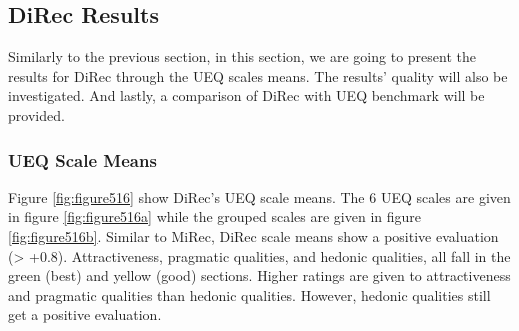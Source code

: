 \subsection{DiRec Results}
Similarly to the previous section, in this section, we are going to present the
results for DiRec through the UEQ scales means. The results' quality will also
be investigated. And lastly, a comparison of DiRec with UEQ benchmark will be
provided.
\subsubsection{UEQ Scale Means}
Figure \ref{fig:figure516} show DiRec's UEQ scale means. The 6 UEQ scales are
given in figure \ref{fig:figure516a} while the grouped scales are given in
figure \ref{fig:figure516b}. Similar to MiRec, DiRec scale means show a
positive evaluation (> +0.8). Attractiveness, pragmatic qualities, and hedonic qualities,
all fall in the green (best) and yellow (good) sections. Higher ratings are
given to attractiveness and pragmatic qualities than hedonic qualities. However,
hedonic qualities still get a positive evaluation.
